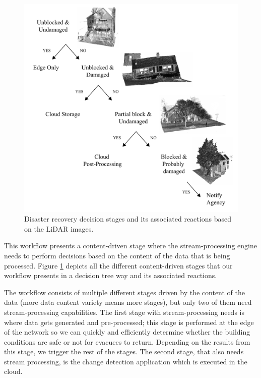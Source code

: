 \begin{figure}[ht]
  \centering
  \includegraphics[width=0.5\linewidth]{Figures/diagonal.pdf}
  \caption{Disaster recovery decision stages and its associated reactions based on the LiDAR images.}
  \label{data_uncertainty}
\end{figure}

This workflow presents a content-driven stage where the stream-processing engine needs to perform decisions based on the content of the data that is being processed. Figure \ref{data_uncertainty} depicts all the different content-driven stages that our workflow presents in a decision tree way and its associated reactions. 

The workflow consists of multiple different stages driven by the content of the data (more data content variety means more stages), but only two of them need stream-processing capabilities. The first stage with stream-processing needs is where data gets generated and pre-processed; this stage is performed at the edge of the network so we can quickly and efficiently determine whether the building conditions are safe or not for evacuees to return. Depending on the results from this stage, we trigger the rest of the stages. The second stage, that also needs stream processing, is the change detection application which is executed in the cloud.

